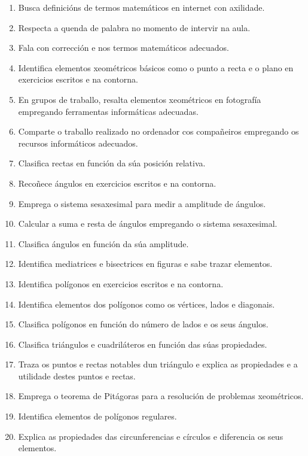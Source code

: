 \begin{enumerate}[label=\bfseries Est\arabic*, align=left, leftmargin=1.5cm]
    \item\label{est:definicions} Busca definicións de termos matemáticos en internet con axilidade.
    \item\label{est:turnopalabra} Respecta a quenda de palabra no momento de intervir na aula.
    \item\label{est:falacorrecion} Fala con corrección e nos termos matemáticos adecuados.
    \item\label{est:puntorecta} Identifica elementos xeométricos básicos como o punto a recta e o plano en exercicios escritos e na contorna.
    \item\label{est:resaltar} En grupos de traballo, resalta elementos xeométricos en fotografía empregando ferramentas informáticas adecuadas.
    \item\label{est:compartir} Comparte o traballo realizado no ordenador cos compañeiros empregando os recursos informáticos adecuados.
    \item\label{est:posrectas} Clasifica rectas en función da súa posición relativa.
    \item\label{est:angulos} Recoñece ángulos en exercicios escritos e na contorna.
    \item\label{est:sexasesimal} Emprega o sistema sesaxesimal para medir a amplitude de ángulos.
    \item\label{est:sumarestaangulos} Calcular a suma e resta de ángulos empregando o sistema sesaxesimal.
    \item\label{est:clasangulos} Clasifica ángulos en función da súa amplitude.
    \item\label{est:mediatriz} Identifica mediatrices e bisectrices en figuras e sabe trazar elementos.
    \item\label{est:poligonos} Identifica polígonos en exercicios escritos e na contorna.
    \item\label{est:elementospoligonos} Identifica elementos dos polígonos como os vértices, lados e diagonais.
    \item\label{est:claspoligolados} Clasifica polígonos en función do número de lados e os seus ángulos.
    \item\label{est:claspoligonos} Clasifica triángulos e cuadriláteros en función das súas propiedades.
    \item\label{est:puntosnotables} Traza os puntos e rectas notables dun triángulo e explica as propiedades e a utilidade destes puntos e rectas.
    \item\label{est:pitagoras} Emprega o teorema de Pitágoras para a resolución de problemas xeométricos.
    \item\label{est:elementosregulares} Identifica elementos de polígonos regulares.
    \item\label{est:circunferencia} Explica as propiedades das circunferencias e círculos e diferencia os seus elementos.
  \end{enumerate}

